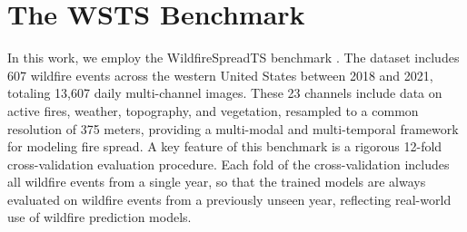 \section{The WSTS Benchmark}
\label{sec:wsts}
In this work, we employ the WildfireSpreadTS benchmark \cite{gerard2023wildfirespreadts}. The dataset includes 607 wildfire events across the western United States between 2018 and 2021, totaling 13,607 daily multi-channel images. These 23 channels include data on active fires, weather, topography, and vegetation, resampled to a common resolution of 375 meters, providing a multi-modal and multi-temporal framework for modeling fire spread. A key feature of this benchmark is a rigorous 12-fold cross-validation evaluation procedure. Each fold of the cross-validation includes all wildfire events from a single year, so that the trained models are always evaluated on wildfire events from a previously unseen year, reflecting real-world use of wildfire prediction models.   